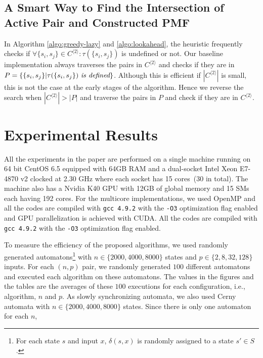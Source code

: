 \documentclass[12pt]{article}
\begin{document}
\subsection{A Smart Way to Find the Intersection of Active Pair and Constructed PMF}
\label{sec:smart}

In Algorithm \ref{algo:greedy-lazy} and \ref{algo:lookahead}, the heuristic frequently checks if $\forall \{ s_i,s_j \} \in C^{\langle 2 \rangle}: \tau(\{ s_i,s_j \})$ is undefined or not. Our baseline implementation always traverses the pairs in $C^{\langle 2 \rangle}$ and checks if they are in $P = \{ \{s_i, s_j \} | \tau(\{s_i, s_j \})~ \mbox{\em is defined} \}$. Although this is efficient if $|C^{\langle 2 \rangle}|$ is small, this is not the case at the early stages of the algorithm. Hence we reverse the search when $|C^{\langle 2 \rangle}| > |P|$ and traverse the pairs in $P$ and check if they are in $C^{\langle 2 \rangle}$.





\clearpage
\section{Experimental Results}
\label{sec:results}

All the experiments in the paper are performed on a single machine running on 64 bit CentOS 6.5 equipped with 64GB RAM and a dual-socket Intel Xeon E7-4870 v2 clocked at 2.30 GHz where each socket  has 15 cores~(30 in total). The machine also has a Nvidia K40 GPU with 12GB of global memory and 15 SMs each having 192 cores. For the multicore implementations, we used OpenMP and all the codes are compiled with {\tt gcc 4.9.2} with the {\tt -O3} optimization flag enabled and GPU parallelization is achieved with CUDA. All the codes are compiled with {\tt gcc 4.9.2} with the {\tt -O3} optimization flag enabled.

To measure the efficiency of the proposed algorithms, we used randomly generated automatons\footnote{For each state $s$ and input $x$, $\delta(s,x)$ is randomly assigned to a state $s' \in S$.} with $n  \in \{2000, 4000, 8000\}$ states and $p \in \{2, 8, 32, 128\}$ inputs. For each $(n, p)$ pair, we randomly generated $100$ different automatons and executed each algorithm on these automatons. The values in the figures and the tables are the averages of these $100$ executions for each configuration, i.e., algorithm, $n$ and $p$. As slowly synchronizing automata, we also used Cerny automata with $n  \in \{2000, 4000, 8000\}$ states. Since there is only one automaton for each $n$, 
\end{document}
